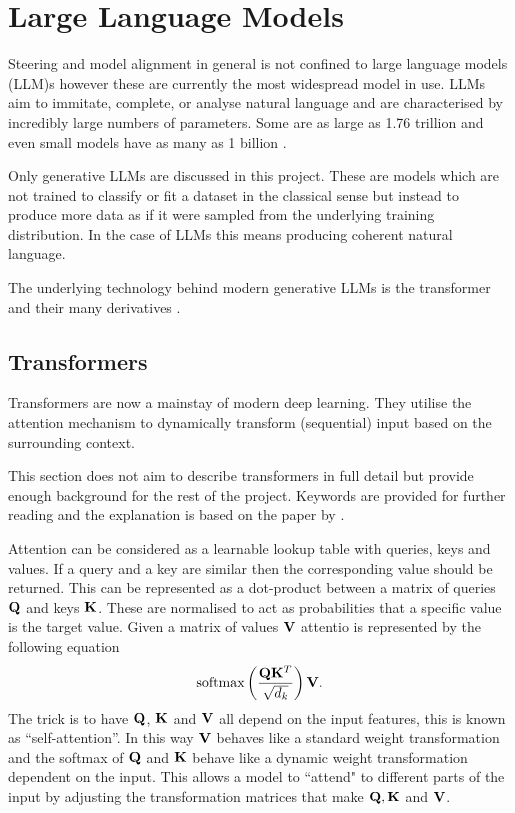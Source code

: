 \section{Large Language Models}

Steering and model alignment in general is not confined to large language models (LLM)s however these are currently the most widespread model in use.
LLMs aim to immitate, complete, or analyse natural language and are characterised by incredibly large numbers of parameters.
Some are as large as 1.76 trillion \cite{gpt4-count} and even small models have as many as 1 billion \cite{gemma}.

Only generative LLMs are discussed in this project.
These are models which are not trained to classify or fit a dataset in the classical sense but instead to produce more data as if it were sampled from the underlying training distribution.
In the case of LLMs this means producing coherent natural language.

The underlying technology behind modern generative LLMs is the transformer \cite{transformers} and their many derivatives \cite{linear-attention, bigbird, linformer}.

\subsection{Transformers}

Transformers \cite{transformers} are now a mainstay of modern deep learning.
They utilise the attention mechanism to dynamically transform (sequential) input based on the surrounding context.

This section does not aim to describe transformers in full detail but provide enough background for the rest of the project.
Keywords are provided for further reading and the explanation is based on the paper by \citet{turner2023}.

Attention can be considered as a learnable lookup table with queries, keys and values.
If a query and a key are similar then the corresponding value should be returned.
This can be represented as a dot-product between a matrix of queries $\mathbf{Q}$ and keys $\mathbf{K}$.
These are normalised to act as probabilities that a specific value is the target value.
Given a matrix of values $\mathbf{V}$ attentio is represented by the following equation
\begin{equation*}
    \text{softmax}\left(\frac{\mathbf{Q}\mathbf{K}^T}{\sqrt{d_k}}\right)\mathbf{V}.
\end{equation*}
The trick is to have $\mathbf{Q}$, $\mathbf{K}$ and $\mathbf{V}$ all depend on the input features, this is known as ``self-attention''.
In this way $\mathbf{V}$ behaves like a standard weight transformation and the softmax of $\mathbf{Q}$ and $\mathbf{K}$ behave like a dynamic weight transformation dependent on the input.
This allows a model to ``attend" to different parts of the input by adjusting the transformation matrices that make $\mathbf{Q}, \mathbf{K}$ and $\mathbf{V}$.

